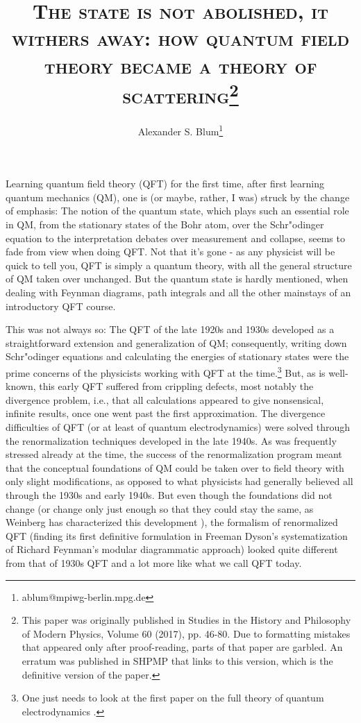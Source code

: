 \documentclass[12pt,a4paper]{article}
\begin{document}
\title{\textsc{\huge{The state is not abolished, it withers away: how quantum field theory became a theory of scattering\footnote{This paper was originally published in Studies in the History and Philosophy of Modern Physics, Volume 60 (2017), pp. 46-80. Due to formatting mistakes that appeared only after proof-reading, parts of that paper are garbled. An erratum was published in SHPMP that links to this version, which is the definitive version of the paper.} }}}
\author{Alexander S. Blum\thanks{ablum@mpiwg-berlin.mpg.de}}
\maketitle

Learning quantum field theory (QFT) for the first time, after first learning quantum mechanics (QM), one is (or maybe, rather, I was) struck by the change of emphasis: The notion of the quantum state, which plays such an essential role in QM, from the stationary states of the Bohr atom, over the Schr"odinger equation to the interpretation debates over measurement and collapse, seems to fade from view when doing QFT. Not that it's gone - as any physicist will be quick to tell you, QFT is simply a quantum theory, with all the general structure of QM taken over unchanged. But the quantum state is hardly mentioned, when dealing with Feynman diagrams, path integrals and all the other mainstays of an introductory QFT course.

This was not always so: The QFT of the late 1920s and 1930s developed as a straightforward extension and generalization of QM; consequently, writing down Schr"odinger equations and calculating the energies of stationary states were the prime concerns of the physicists working with QFT at the time.\footnote{One just needs to look at the first paper on the full theory of quantum electrodynamics \citep{heisenberg_1929_zur-quantendynamik}.} But, as is well-known, this early QFT suffered from crippling defects, most notably the divergence problem, i.e., that all calculations appeared to give nonsensical, infinite results, once one went past the first approximation. The divergence difficulties of QFT (or at least of quantum electrodynamics) were solved through the renormalization techniques developed in the late 1940s. As was frequently stressed already at the time, the success of the renormalization program meant that the conceptual foundations of QM could be taken over to field theory with only slight modifications, as opposed to what physicists had generally believed all through the 1930s and early 1940s. But even though the foundations did not change (or change only just enough so that they could stay the same, as Weinberg has characterized this development \citep[p.18]{weinberg_1977_the-search}), the formalism of renormalized QFT (finding its first definitive formulation in Freeman Dyson's systematization of Richard Feynman's modular diagrammatic approach) looked quite different from that of 1930s QFT and a lot more like what we call QFT today.
\end{document}

